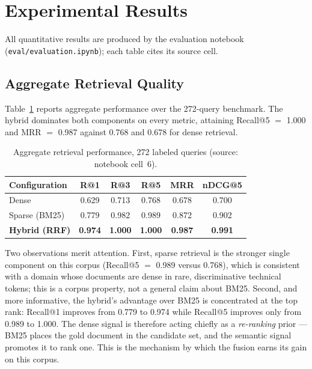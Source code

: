 \documentclass[12pt, a4paper]{article}
\begin{document}
\section{Experimental Results}
\label{sec:eval}

All quantitative results are produced by the evaluation notebook (\texttt{eval/evaluation.ipynb}); each table cites its source cell.

\subsection{Aggregate Retrieval Quality}

Table~\ref{tab:retrieval} reports aggregate performance over the 272-query benchmark. The hybrid dominates both components on every metric, attaining Recall@5 $=$ 1.000 and MRR $=$ 0.987 against 0.768 and 0.678 for dense retrieval.

\begin{table}[H]
\centering
\caption{Aggregate retrieval performance, 272 labeled queries (source: notebook cell~6).}
\begin{tabular}{lccccc}
\toprule
\textbf{Configuration} & \textbf{R@1} & \textbf{R@3} & \textbf{R@5} & \textbf{MRR} & \textbf{nDCG@5} \\
\midrule
Dense & 0.629 & 0.713 & 0.768 & 0.678 & 0.700 \\
Sparse (BM25) & 0.779 & 0.982 & 0.989 & 0.872 & 0.902 \\
\textbf{Hybrid (RRF)} & \textbf{0.974} & \textbf{1.000} & \textbf{1.000} & \textbf{0.987} & \textbf{0.991} \\
\bottomrule
\end{tabular}
\label{tab:retrieval}
\end{table}

Two observations merit attention. First, sparse retrieval is the stronger single component on this corpus (Recall@5 $=$ 0.989 versus 0.768), which is consistent with a domain whose documents are dense in rare, discriminative technical tokens; this is a corpus property, not a general claim about BM25. Second, and more informative, the hybrid's advantage over BM25 is concentrated at the top rank: Recall@1 improves from 0.779 to 0.974 while Recall@5 improves only from 0.989 to 1.000. The dense signal is therefore acting chiefly as a \emph{re-ranking} prior — BM25 places the gold document in the candidate set, and the semantic signal promotes it to rank one. This is the mechanism by which the fusion earns its gain on this corpus.
\end{document}
